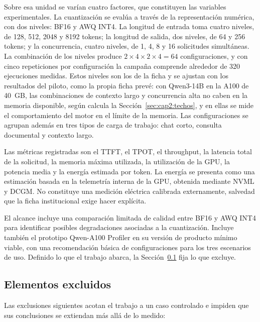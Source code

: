 Sobre esa unidad se varían cuatro factores, que constituyen las variables experimentales. La cuantización se evalúa a través de la representación numérica, con dos niveles: BF16 y AWQ INT4. La longitud de entrada toma cuatro niveles, de 128, 512, 2048 y 8192 tokens; la longitud de salida, dos niveles, de 64 y 256 tokens; y la concurrencia, cuatro niveles, de 1, 4, 8 y 16 solicitudes simultáneas. La combinación de los niveles produce $2 \times 4 \times 2 \times 4 = 64$ configuraciones, y con cinco repeticiones por configuración la campaña comprende alrededor de 320 ejecuciones medidas. Estos niveles son los de la ficha y se ajustan con los resultados del piloto, como la propia ficha prevé: con Qwen3-14B en la A100 de 40~GB, las combinaciones de contexto largo y concurrencia alta no caben en la memoria disponible, según calcula la Sección~\ref{sec:cap2:techos}, y en ellas se mide el comportamiento del motor en el límite de la memoria. Las configuraciones se agrupan además en tres tipos de carga de trabajo: chat corto, consulta documental y contexto largo.

Las métricas registradas son el TTFT, el TPOT, el throughput, la latencia total de la solicitud, la memoria máxima utilizada, la utilización de la GPU, la potencia media y la energía estimada por token. La energía se presenta como una estimación basada en la telemetría interna de la GPU, obtenida mediante NVML y DCGM. No constituye una medición eléctrica calibrada externamente, salvedad que la ficha institucional exige hacer explícita.

El alcance incluye una comparación limitada de calidad entre BF16 y AWQ INT4 para identificar posibles degradaciones asociadas a la cuantización. Incluye también el prototipo Qwen-A100 Profiler en su versión de producto mínimo viable, con una recomendación básica de configuraciones para los tres escenarios de uso. Definido lo que el trabajo abarca, la Sección~\ref{sec:cap1:delimitaciones} fija lo que excluye.

\subsection{Elementos excluidos}
\label{sec:cap1:delimitaciones}

Las exclusiones siguientes acotan el trabajo a un caso controlado e impiden que sus conclusiones se extiendan más allá de lo medido:

